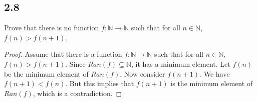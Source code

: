 \subsection*{2.8} Prove that there is no function $f: \mathbb{N} \rightarrow \mathbb{N}$ such that for all $n \in \mathbb{N}$, $f(n) > f(n+1)$.

\begin{proof}
Assume that there is a function $f: \mathbb{N} \rightarrow \mathbb{N}$ such that for all $n \in \mathbb{N}$, $f(n) > f(n+1)$. Since $Ran(f) \subseteq \mathbb{N}$, it has a minimum element. Let $f(n)$ be the minimum element of $Ran(f)$. Now consider $f(n+1)$. We have $f(n+1) < f(n)$. But this implies that $f(n+1)$ is the minimum element of $Ran(f)$, which is a contradiction.
\end{proof}

